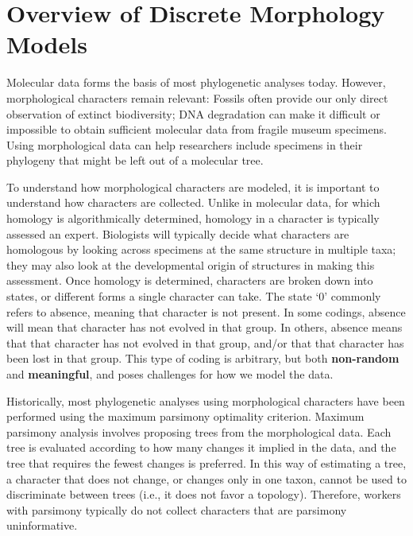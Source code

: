 \section{Overview of Discrete Morphology Models} \label{sec:dm_overview}
\begin{figure}[h!]
\label{fig:module-gm}
\end{figure}
Molecular data forms the basis of most phylogenetic analyses today. 
However, morphological characters remain relevant: Fossils often provide our only direct observation of extinct biodiversity; DNA degradation can make it difficult or impossible to obtain sufficient molecular data from fragile museum specimens. 
Using morphological data can help researchers include specimens in their phylogeny that might be left out of a molecular tree. \par
To understand how morphological characters are modeled, it is important to understand how characters are collected.
Unlike in molecular data, for which homology is algorithmically determined, homology in a character is typically assessed an expert. 
Biologists will typically decide what characters are homologous by looking across specimens at the same structure in multiple taxa; they may also look at the developmental origin of structures in making this assessment.
Once homology is determined, characters are broken down into states, or different forms a single character can take.
The state `0' commonly refers to absence, meaning that character is not present.
In some codings, absence will mean that character has not evolved in that group.
In others, absence means that that character has not evolved in that group, and/or that that character has been lost in that group. 
This type of coding is arbitrary, but both \textbf{non-random} and \textbf{meaningful}, and poses challenges for how we model the data. 
\par

Historically, most phylogenetic analyses using morphological characters have been performed using the maximum parsimony optimality criterion. 
Maximum parsimony analysis involves proposing trees from the morphological data.
Each tree is evaluated according to how many changes it implied in the data, and the tree that requires the fewest changes is preferred.
In this way of estimating a tree, a character that does not change, or changes only in one taxon, cannot be used to discriminate between trees (i.e., it does not favor a topology).
Therefore, workers with parsimony typically do not collect characters that are parsimony uninformative.
\par

